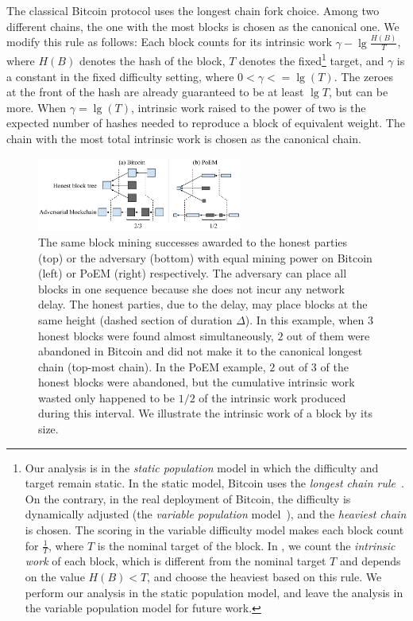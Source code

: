 \noindent
{}
The classical Bitcoin protocol uses the longest chain fork choice. Among two different
chains, the one with the most blocks is chosen as the canonical one. We modify this
rule as follows: Each block counts for its intrinsic work $\gamma-\lg \frac{H(B)}{T}$,
where $H(B)$ denotes the hash of the block, $T$ denotes the fixed\footnote{Our
analysis is in the \emph{static population} model in which the difficulty
and target remain static. In the static model, Bitcoin uses the \emph{longest chain rule}~\cite{backbone}.
On the contrary, in the real deployment of Bitcoin, the difficulty is dynamically adjusted (the
\emph{variable population} model~\cite{varbackbone}), and the \emph{heaviest chain} is chosen.
The scoring in the variable difficulty model makes each block count for $\frac{1}{T}$, where
$T$ is the nominal target of the block. In \poem, we count the \emph{intrinsic work}
of each block, which is different from the nominal target $T$ and depends on the value $H(B) < T$,
and choose the heaviest based on this rule.
We perform our analysis in the static population model, and leave the analysis in the variable
population model for future work.} target, and $\gamma$ is a constant in the fixed difficulty setting, where $0 < \gamma <= \lg(T)$.
The zeroes at the front of the hash are already guaranteed to be at least $\lg T$, but can be more. 
When $\gamma = \lg(T)$, intrinsic work raised to the power of two is the expected number of hashes needed to reproduce a block of equivalent weight.
The chain with the most total intrinsic work is chosen as the canonical chain.

\begin{figure}
  \centering
  \includegraphics[width=0.6\textwidth,keepaspectratio]{figures/poem_work_wasted.pdf}
  \caption{The same block mining successes awarded to the honest parties (top) or the adversary (bottom)
           with equal mining power on Bitcoin (left) or PoEM (right) respectively. The adversary can place
           all blocks in one sequence because she does not incur any network delay. The honest parties,
           due to the delay, may place blocks at the same height (dashed section of duration $\Delta$).
           In this example, when $3$ honest blocks were found almost simultaneously, $2$ out of
           them were abandoned in Bitcoin and did not make it to the canonical longest chain
           (top-most chain).
           In the PoEM example, $2$ out of $3$ of the honest blocks were abandoned, but the cumulative intrinsic
           work wasted only happened to be $1/2$ of the intrinsic work produced during this interval.
           We illustrate the intrinsic work of a block by its size.}
  \label{fig:poem-wasted-work}
\end{figure}

